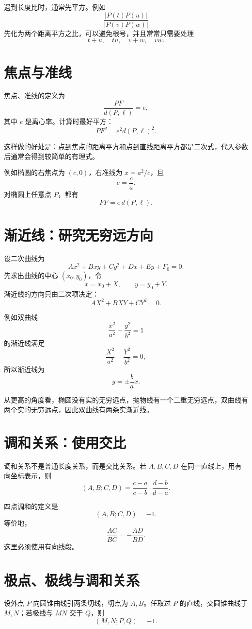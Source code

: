 \documentclass[11pt,a4paper]{ctexart}
\begin{document}
遇到长度比时，通常先平方。例如
\[
\frac{|P(t)P(u)|}{|P(v)P(w)|}
\]
先化为两个距离平方之比，可以避免根号，并且常常只需要处理
\[
t+u,\quad tu,\quad v+w,\quad vw.
\]

\section{焦点与准线}

焦点、准线的定义为
\[
\frac{PF}{d(P,\ell)}=e,
\]
其中 $e$ 是离心率。计算时最好平方：
\[
\boxed{PF^2=e^2d(P,\ell)^2}.
\]

这样做的好处是：点到焦点的距离平方和点到直线距离平方都是二次式，代入参数后通常会得到较简单的有理式。

例如椭圆的右焦点为 $(c,0)$，右准线为 $x=a^2/c$，且
\[
e=\frac ca.
\]
对椭圆上任意点 $P$，都有
\[
PF=e\,d(P,\ell).
\]

\section{渐近线：研究无穷远方向}

设二次曲线为
\[
Ax^2+Bxy+Cy^2+Dx+Ey+F_0=0.
\]
先求出曲线的中心 $(x_0,y_0)$，令
\[
x=x_0+X,\qquad y=y_0+Y.
\]
渐近线的方向只由二次项决定：
\[
\boxed{AX^2+BXY+CY^2=0}.
\]

例如双曲线
\[
\frac{x^2}{a^2}-\frac{y^2}{b^2}=1
\]
的渐近线满足
\[
\frac{X^2}{a^2}-\frac{Y^2}{b^2}=0,
\]
所以渐近线为
\[
\boxed{y=\pm\frac ba x}.
\]

从更高的角度看，椭圆没有实的无穷远点，抛物线有一个二重无穷远点，双曲线有两个实的无穷远点，因此双曲线有两条实渐近线。

\section{调和关系：使用交比}

调和关系不是普通长度关系，而是交比关系。若 $A,B,C,D$ 在同一直线上，用有向坐标表示，则
\[
(A,B;C,D)=
\frac{c-a}{c-b}\cdot\frac{d-b}{d-a}.
\]

四点调和的定义是
\[
\boxed{(A,B;C,D)=-1}.
\]
等价地，
\[
\boxed{\frac{AC}{BC}=-\frac{AD}{BD}}.
\]
这里必须使用有向线段。

\section{极点、极线与调和关系}

设外点 $P$ 向圆锥曲线引两条切线，切点为 $A,B$。任取过 $P$ 的直线，交圆锥曲线于 $M,N$；若极线与 $MN$ 交于 $Q$，则
\[
\boxed{(M,N;P,Q)=-1}.
\]
\end{document}
